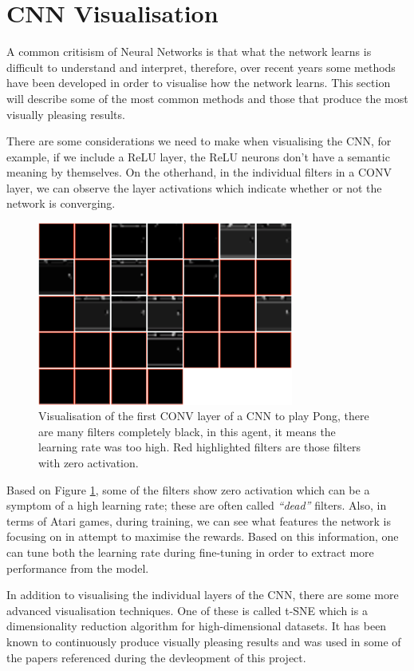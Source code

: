 \newpage

\section{CNN Visualisation}
\label{bg:sec:cnn-vis}
A common critisism of Neural Networks is that what the network learns is difficult to understand and interpret, therefore, over recent years some methods have been developed in order to visualise how the network learns. This section will describe some of the most common methods and those that produce the most visually pleasing results.

There are some considerations we need to make when visualising the CNN, for example, if we include a ReLU layer, the ReLU neurons don't have a semantic meaning by themselves. On the otherhand, in the individual filters in a CONV layer, we can observe the layer activations which indicate whether or not the network is converging.

\begin{figure}[ht!]
	\centering
	\includegraphics[width=0.75\textwidth]{chapters/chapter2/images/viz.png}
	\caption[Visualisation of the filters from the first layer of a CNN used to play Pong]{Visualisation of the first CONV layer of a CNN to play Pong, there are many filters completely black, in this agent, it means the learning rate was too high. Red highlighted filters are those filters with zero activation.
		\label{fig:cnn-viz-activ}
	}
\end{figure}

Based on Figure \ref{fig:cnn-viz-activ}, some of the filters show zero activation which can be a symptom of a high learning rate; these are often called \textit{``dead''} filters. Also, in terms of Atari games, during training, we can see what features the network is focusing on in attempt to maximise the rewards. Based on this information, one can tune both the learning rate during fine-tuning in order to extract more performance from the model.

In addition to visualising the individual layers of the CNN, there are some more advanced visualisation techniques. One of these is called t-SNE which is a dimensionality reduction algorithm for high-dimensional datasets. It has been known to continuously produce visually pleasing results and was used in some of the papers referenced during the devleopment of this project.

